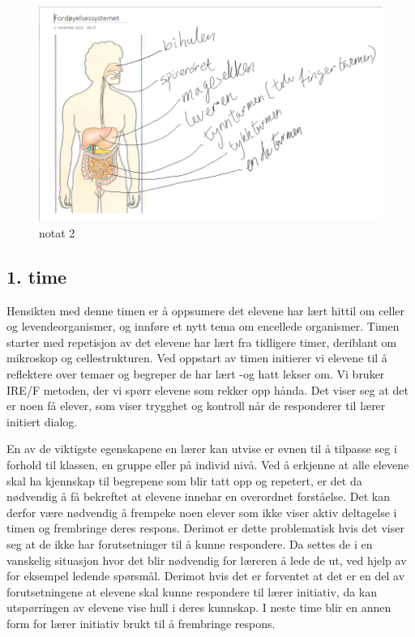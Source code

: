 \documentclass[main.tex]{subfiles}
\begin{document}
\begin{figure}[h!]
\includegraphics[scale = 0.6]{../figures/onenote_fordoyelse.png}
\caption{notat 2}
\label{fig:notat2}
\end{figure}

\subsection*{1. time}

Hensikten med denne timen er å oppsumere det elevene har lært hittil om celler og 
levendeorganismer, og innføre et nytt tema om encellede organismer. Timen starter med repetisjon 
av det elevene har lært fra tidligere timer, deriblant om mikroskop og cellestrukturen. Ved oppstart 
av timen initierer vi elevene til å reflektere over temaer og begreper de har lært -og hatt lekser 
om. Vi bruker IRE/F metoden, der vi spørr elevene som rekker opp hånda. Det viser seg at det 
er noen få elever, som viser trygghet og kontroll når de responderer til lærer initiert dialog. 

En av de viktigste egenskapene en lærer kan utvise er evnen til å tilpasse seg i forhold til 
klassen, en gruppe eller på individ nivå. Ved å erkjenne at alle elevene skal ha kjennskap til 
begrepene som blir tatt opp og repetert, er det da nødvendig å få bekreftet at elevene innehar en 
overordnet forståelse. Det kan derfor være nødvendig å frempeke noen elever som ikke viser aktiv 
deltagelse i timen og frembringe deres respons. Derimot er dette problematisk hvis det viser seg at 
de ikke har forutsetninger til å kunne respondere. Da settes de i en vanskelig situasjon hvor det 
blir nødvendig for læreren å lede de ut, ved hjelp av for eksempel ledende spørsmål. Derimot hvis 
det er forventet at det er en del av forutsetningene at elevene skal kunne respondere til lærer 
initiativ, da kan utspørringen av elevene vise hull i deres kunnskap. I neste time blir en 
annen form for lærer initiativ brukt til å frembringe respons. 
 
\end{document}
